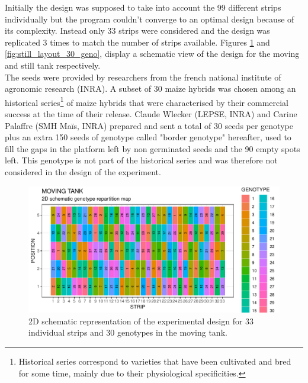Initially the design was supposed to take into account the 99 different strips individually but the program couldn't converge to 
an optimal design because of its complexity. Instead only 33 strips were considered and the design was replicated 3 times to 
match the number of strips available. Figures \ref{fig:moving_layout_30_geno} and \ref{fig:still_layout_30_geno}, display a schematic view 
of the design for the moving and still tank respectively.\\

The seeds were provided by researchers from the french national institute of agronomic research (INRA). A subset of 30 maize hybrids was chosen among an historical series\footnote{Historical series correspond to varieties that have been cultivated and bred for 
some time, mainly due to their physiological specificities.} of maize hybrids that were characterised by their commercial success at the time of their release. Claude Wlecker (LEPSE, INRA) and Carine Palaffre (SMH Maïs, INRA) prepared and sent a total of 30 seeds per genotype plus an extra 150 seeds of genotype called "border genotype" hereafter, used to fill the gaps in the platform left by non germinated seeds and the 90 empty spots left. This genotype is not part of the historical series and was therefore not considered in the design of the experiment.

\begin{figure}
    \includegraphics[width=\textwidth]{../../Figures/design_layout_moving.pdf} 
    \caption{2D schematic representation of the experimental design for 33 individual strips and 30 genotypes in the moving 
    tank.}
    \label{fig:moving_layout_30_geno}
\end{figure}

